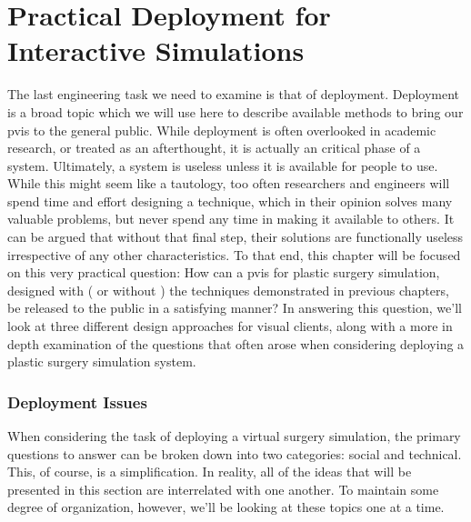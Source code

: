 \chapter{Practical Deployment for Interactive Simulations}
\label{chp:deployment}

The last engineering task we need to examine is that of
deployment. Deployment is a broad topic which we will use here to
describe available methods to bring our \gls{pvis} to the general
public. While deployment is often overlooked in academic research, or
treated as an afterthought, it is actually an critical phase of a
system. Ultimately, a system is useless unless it is available for
people to use. While this might seem like a tautology, too often
researchers and engineers will spend time and effort designing a
technique, which in their opinion solves many valuable problems, but
never spend any time in making it available to others. It can be
argued that without that final step, their solutions are functionally
useless irrespective of any other characteristics.  To that end, this
chapter will be focused on this very practical question: How can a
\gls{pvis} for plastic surgery simulation, designed with ( or without
) the techniques demonstrated in previous chapters, be released to the
public in a satisfying manner? In answering this question, we'll look
at three different design approaches for visual clients, along with a
more in depth examination of the questions that often arose when
considering deploying a plastic surgery simulation system.

\subsection{Deployment Issues}

When considering the task of deploying a virtual surgery simulation,
the primary questions to answer can be broken down into two
categories: social and technical. This, of course, is a
simplification. In reality, all of the ideas that will be presented in
this section are interrelated with one another. To maintain some
degree of organization, however, we'll be looking at these topics one
at a time.

